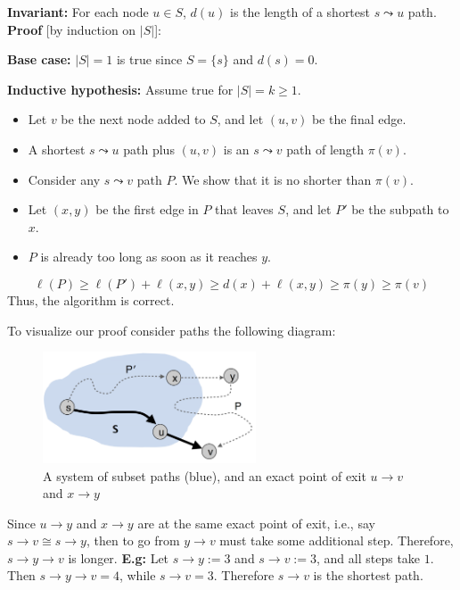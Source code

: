 \begin{Proof}

    \textbf{Invariant:} For each node $u \in S$, $d(u)$ is the length of a shortest $s \leadsto u$ path.\\
    \textbf{Proof} [by induction on $|S|$]:
    
    \textbf{Base case:} $|S| = 1$ is true since $S = \{s\}$ and $d(s) = 0$.
    
    \textbf{Inductive hypothesis:} Assume true for $|S| = k \geq 1$.
    \begin{itemize}
        \item Let $v$ be the next node added to $S$, and let $(u, v)$ be the final edge.
        \item A shortest $s \leadsto u$ path plus $(u, v)$ is an $s \leadsto v$ path of length $\pi(v)$.
        \item Consider any $s \leadsto v$ path $P$. We show that it is no shorter than $\pi(v)$.
        \item Let $(x, y)$ be the first edge in $P$ that leaves $S$, and let $P'$ be the subpath to $x$.
        \item $P$ is already too long as soon as it reaches $y$.
    \end{itemize}
    \[
    \ell(P) \geq \ell(P') + \ell(x, y) \geq d(x) + \ell(x, y) \geq \pi(y) \geq \pi(v)
    \]
    \noindent
    Thus, the algorithm is correct.
    \end{Proof}
    
\newpage

\noindent
To visualize our proof consider paths the following diagram:
\begin{figure}[h]
    \begin{center}
      \includegraphics[height=1.3in]{./Sections/dstra/dstra_proof.png}
    \end{center}
     \caption{A system of subset paths (blue), and an exact point of exit $u\to v$ and $x\to y$}\label{fig:dstra_proof}
\end{figure}

\noindent
Since $u\to y$ and $x\to y$ are at the same exact point of exit, i.e., say $s\to v\cong s\to y$, then to go from $y\to v$ must take some additional step.
Therefore, $s\to y\to v$ is longer. \textbf{E.g:} Let $s\to y:= 3$ and $s\to v:= 3$, and all steps take $1$.
Then $s\to y\to v = 4$, while $s\to v = 3$. Therefore $s\to v$ is the shortest path.\\

